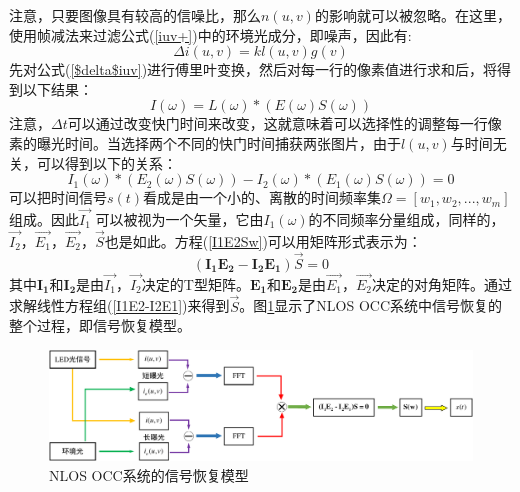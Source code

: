 注意，只要图像具有较高的信噪比，那么$n(u,v)$的影响就可以被忽略。在这里，使用帧减法来过滤公式(\ref{iuv+})中的环境光成分，即噪声，因此有:
\begin{equation}\label{$delta$iuv}
  \Delta i(u,v) = kl(u,v)g(v)
  \end{equation}
先对公式(\ref{$delta$iuv})进行傅里叶变换，然后对每一行的像素值进行求和后，将得到以下结果：
  \begin{equation}\label{Iw}
  I(\omega )=L(\omega )*(E(\omega )S(\omega ))
  \end{equation}
注意，$\Delta t $可以通过改变快门时间来改变，这就意味着可以选择性的调整每一行像素的曝光时间。当选择两个不同的快门时间捕获两张图片，由于$l(u,v)$与时间无关，可以得到以下的关系：
  \begin{equation}\label{I1E2Sw}
  I_{1}(\omega )*(E_{2}(\omega )S(\omega ))-I_{2}(\omega )*(E_{1}(\omega )S(\omega ))=0
  \end{equation}
可以把时间信号$s(t)$看成是由一个小的、离散的时间频率集$Ω=[w_1,w_2,...,w_m]$组成。因此$\vec{I_1}$ 可以被视为一个矢量，它由$I_{1}(ω)$的不同频率分量组成，同样的，$\vec{I_2}$，$\vec{E_1}$，$\vec{E_2}$，$\vec{S}$也是如此。方程(\ref{I1E2Sw})可以用矩阵形式表示为：
  \begin{equation}\label{I1E2-I2E1}
  (\mathbf{I_{1}E_{2}} -\mathbf{I_{2}E_{1}} )\vec{S}=0
  \end{equation}
 其中$\mathbf{I_1}$和$\mathbf{I_2}$是由$\vec{I_1}$，$\vec{I_2}$决定的T型矩阵。$\mathbf{E_1}$和$\mathbf{E_2}$是由$\vec{E_1}$，$\vec{E_2}$决定的对角矩阵。通过求解线性方程组(\ref{I1E2-I2E1})来得到$\vec{S}$。图\ref{fig:signalrecovery}显示了NLOS OCC系统中信号恢复的整个过程，即信号恢复模型。
\begin{figure}[!t]
  \centering
  \includegraphics[width=\linewidth]{FIG/signalrecovery.pdf}
  \caption{NLOS OCC系统的信号恢复模型}
  \label{fig:signalrecovery}
\end{figure}


